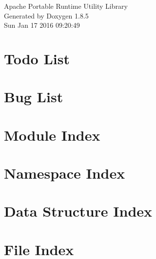 \documentclass[twoside]{book}
\newcommand{\clearemptydoublepage}{%
  \newpage{\pagestyle{empty}\cleardoublepage}%
}
\begin{document}
\hypersetup{pageanchor=false}
\begin{titlepage}
\vspace*{7cm}
\begin{center}%
{\Large Apache Portable Runtime Utility Library }\\
\vspace*{1cm}
{\large Generated by Doxygen 1.8.5}\\
\vspace*{0.5cm}
{\small Sun Jan 17 2016 09:20:49}\\
\end{center}
\end{titlepage}
\clearemptydoublepage
\tableofcontents
\clearemptydoublepage
{}
\hypersetup{pageanchor=true}

\chapter{Todo List}
\label{todo}
\hypertarget{todo}{}

\chapter{Bug List}
\label{bug}
\hypertarget{bug}{}

\chapter{Module Index}

\chapter{Namespace Index}

\chapter{Data Structure Index}

\chapter{File Index}

\end{document}
